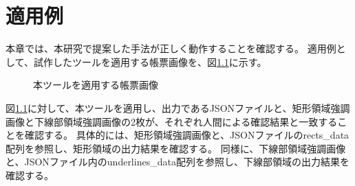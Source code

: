 \chapter{適用例}\label{cha:Indication}
本章では、本研究で提案した手法が正しく動作することを確認する。
適用例として、試作したツールを適用する帳票画像を、図\ref{fig:indication_original}に示す。

\begin{figure}[t]
    \begin{center}
        \caption{本ツールを適用する帳票画像}
        \label{fig:indication_original}
    \end{center}
\end{figure}

図\ref{fig:indication_original}に対して、本ツールを適用し、出力であるJSONファイルと、矩形領域強調画像と下線部領域強調画像の2枚が、それぞれ人間による確認結果と一致することを確認する。
具体的には、矩形領域強調画像と、JSONファイルのrects\_data配列を参照し、矩形領域の出力結果を確認する。
同様に、下線部領域強調画像と、JSONファイル内のunderlines\_data配列を参照し、下線部領域の出力結果を確認する。

